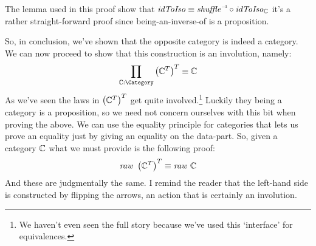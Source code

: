 The lemma used in this proof show that $\idToIso \equiv \inv{\shuffle} \comp
\idToIso_{\bC}$ it's a rather straight-forward proof since being-an-inverse-of
is a proposition.

So, in conclusion, we've shown that the opposite category is indeed a category.
We can now proceed to show that this construction is an involution, namely:
%
$$
\prod_{\bC : \Category} \left(\bC^T\right)^T \equiv \bC
$$
%
As we've seen the laws in $\left(\mathbb{C}^T\right)^T$ get quite involved.\footnote{We
  haven't even seen the full story because we've used this `interface' for
  equivalences.} Luckily they being a category is a proposition, so we need not
concern ourselves with this bit when proving the above. We can use the equality
principle for categories that lets us prove an equality just by giving an
equality on the data-part. So, given a category $\mathbb{C}$ what we must provide is
the following proof:
%
$$
\mathit{raw}\ \left(\bC^T\right)^T \equiv \mathit{raw}\ \bC
$$
%
And these are judgmentally the same. I remind the reader that the left-hand side
is constructed by flipping the arrows, an action that is certainly an
involution.









